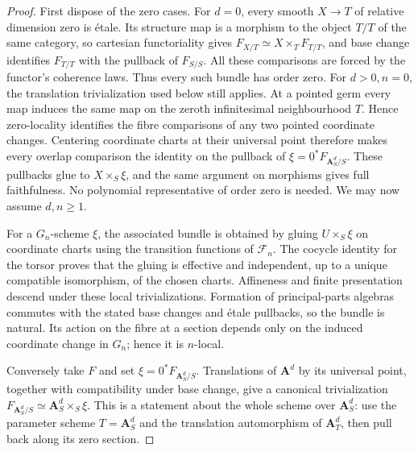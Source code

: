 \begin{proof}
First dispose of the zero cases. For $d=0$, every smooth $X\to T$ of
relative dimension zero is \'etale. Its structure map is a morphism to
the object $T/T$ of the same category, so cartesian functoriality gives
$F_{X/T}\simeq X\times_TF_{T/T}$, and base change identifies $F_{T/T}$
with the pullback of $F_{S/S}$. All these comparisons are forced by the
functor's coherence laws. Thus every such bundle has order zero.
For $d>0,n=0$, the translation trivialization used below still applies.
At a pointed germ every map induces the same map on the zeroth
infinitesimal neighbourhood $T$. Hence zero-locality identifies the fibre
comparisons of any two pointed coordinate changes. Centering coordinate
charts at their universal point therefore makes every overlap comparison
the identity on the pullback of $\xi=0^*F_{\mathbf A^d_S/S}$.
These pullbacks glue to $X\times_S\xi$, and the same argument on morphisms
gives full faithfulness. No polynomial representative of order zero is
needed. We may now assume $d,n\geq1$.

For a $G_n$-scheme $\xi$, the associated bundle is obtained by gluing
$U\times_S\xi$ on coordinate charts using the transition functions of
$\mathcal F_n$. The cocycle identity for the torsor proves that the gluing
is effective and independent, up to a unique compatible isomorphism, of the
chosen charts. Affineness and finite presentation descend under these local
trivializations. Formation of principal-parts algebras commutes with the
stated base changes and \'{e}tale pullbacks, so the bundle is natural.
Its action on the fibre at a section depends only on the induced coordinate
change in $G_n$; hence it is $n$-local.

Conversely take $F$ and set $\xi=0^*F_{\mathbf A^d_S/S}$. Translations of
$\mathbf A^d$ by its universal point, together with compatibility under
base change, give a canonical trivialization
$F_{\mathbf A^d_S/S}\simeq\mathbf A^d_S\times_S\xi$. This is a statement
about the whole scheme over $\mathbf A^d_S$: use the parameter scheme
$T=\mathbf A^d_S$ and the translation automorphism of $\mathbf A^d_T$,
then pull back along its zero section.


\end{proof}
